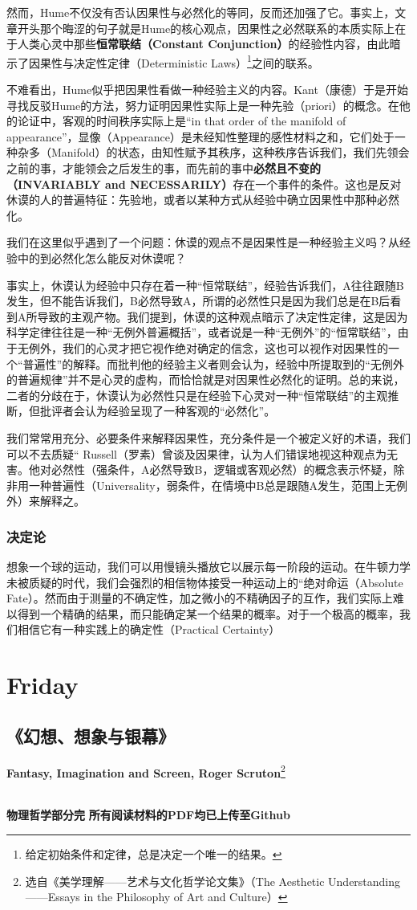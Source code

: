\documentclass[12pt, a4paper, oneside]{ctexart}
\renewcommand{\b}{\textbf}
\newcommand{\f}{\footnote}
\newcommand{\q}[1]{\begin{questionbox}{}#1\end{questionbox}}
\newcommand{\ans}[1]{\begin{ansbox}{}#1\end{ansbox}}
\newcounter{question}[section]
\newcounter{ans}[section]
\begin{document}
然而，Hume不仅没有否认因果性与必然化的等同，反而还加强了它。事实上，文章开头那个晦涩的句子就是Hume的核心观点，因果性之必然联系的本质实际上在于人类心灵中那些\b{恒常联结（Constant Conjunction）}的经验性内容，由此暗示了因果性与决定性定律（Deterministic Laws）\f{给定初始条件和定律，总是决定一个唯一的结果。}之间的联系。

不难看出，Hume似乎把因果性看做一种经验主义的内容。Kant（康德）于是开始寻找反驳Hume的方法，努力证明因果性实际上是一种先验（priori）的概念。在他的论证中，客观的时间秩序实际上是“in that order of the manifold of appearance”，显像（Appearance）是未经知性整理的感性材料之和，它们处于一种杂多（Manifold）的状态，由知性赋予其秩序，这种秩序告诉我们，我们先领会之前的事，才能领会之后发生的事，而先前的事中\b{必然且不变的（INVARIABLY and NECESSARILY）}存在一个事件的条件。这也是反对休谟的人的普遍特征：先验地，或者以某种方式从经验中确立因果性中那种必然化。

\q{我们在这里似乎遇到了一个问题：休谟的观点不是因果性是一种经验主义吗？从经验中的到必然化怎么能反对休谟呢？}
\ans{事实上，休谟认为经验中只存在着一种“恒常联结”，经验告诉我们，A往往跟随B发生，但不能告诉我们，B必然导致A，所谓的必然性只是因为我们总是在B后看到A所导致的主观产物。我们提到，休谟的这种观点暗示了决定性定律，这是因为科学定律往往是一种“无例外普遍概括”，或者说是一种“无例外”的“恒常联结”，由于无例外，我们的心灵才把它视作绝对确定的信念，这也可以视作对因果性的一个“普遍性”的解释。而批判他的经验主义者则会认为，经验中所提取到的“无例外的普遍规律”并不是心灵的虚构，而恰恰就是对因果性必然化的证明。总的来说，二者的分歧在于，休谟认为必然性只是在经验下心灵对一种“恒常联结”的主观推断，但批评者会认为经验呈现了一种客观的“必然化”。}

我们常常用充分、必要条件来解释因果性，充分条件是一个被定义好的术语，我们可以不去质疑“
Russell（罗素）曾谈及因果律，认为人们错误地视这种观点为无害。他对必然性（强条件，A必然导致B，逻辑或客观必然）的概念表示怀疑，除非用一种普遍性（Universality，弱条件，在情境中B总是跟随A发生，范围上无例外）来解释之。

\subsubsection{决定论}

想象一个球的运动，我们可以用慢镜头播放它以展示每一阶段的运动。在牛顿力学未被质疑的时代，我们会强烈的相信物体接受一种运动上的“绝对命运（Absolute Fate）。然而由于测量的不确定性，加之微小的不精确因子的互作，我们实际上难以得到一个精确的结果，而只能确定某一个结果的概率。对于一个极高的概率，我们相信它有一种实践上的确定性（Practical Certainty）

\section{Friday}
\subsection{《幻想、想象与银幕》}
\textbf{Fantasy, Imagination and Screen, Roger Scruton}\f{选自《美学理解——艺术与文化哲学论文集》（The Aesthetic Understanding——Essays in the Philosophy of Art and Culture）}

\hspace*{\fill} \\
\center
\textbf{\large{物理哲学部分完}}
\textbf{所有阅读材料的PDF均已上传至Github}
\end{document}

